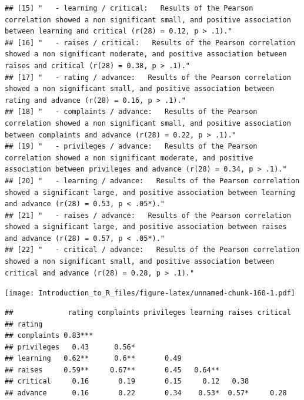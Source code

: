 \documentclass[]{book}
\newenvironment{Shaded}{\begin{snugshade}}{\end{snugshade}}
\newcommand{\CommentTok}[1]{\textcolor[rgb]{0.56,0.35,0.01}{\textit{#1}}}
\newcommand{\NormalTok}[1]{#1}
\newcommand{\OperatorTok}[1]{\textcolor[rgb]{0.81,0.36,0.00}{\textbf{#1}}}
\theoremstyle{definition}
\theoremstyle{definition}
\theoremstyle{definition}
\theoremstyle{remark}
\begin{document}
\begin{verbatim}
## [15] "   - learning / critical:   Results of the Pearson correlation showed a non significant small, and positive association between learning and critical (r(28) = 0.12, p > .1)."          
## [16] "   - raises / critical:   Results of the Pearson correlation showed a non significant moderate, and positive association between raises and critical (r(28) = 0.38, p > .1)."           
## [17] "   - rating / advance:   Results of the Pearson correlation showed a non significant small, and positive association between rating and advance (r(28) = 0.16, p > .1)."                
## [18] "   - complaints / advance:   Results of the Pearson correlation showed a non significant small, and positive association between complaints and advance (r(28) = 0.22, p > .1)."        
## [19] "   - privileges / advance:   Results of the Pearson correlation showed a non significant moderate, and positive association between privileges and advance (r(28) = 0.34, p > .1)."     
## [20] "   - learning / advance:   Results of the Pearson correlation showed a significant large, and positive association between learning and advance (r(28) = 0.53, p < .05*)."              
## [21] "   - raises / advance:   Results of the Pearson correlation showed a significant large, and positive association between raises and advance (r(28) = 0.57, p < .05*)."                  
## [22] "   - critical / advance:   Results of the Pearson correlation showed a non significant small, and positive association between critical and advance (r(28) = 0.28, p > .1)."
\end{verbatim}

\begin{Shaded}
\end{Shaded}

\texttt{[image: Introduction\_to\_R\_files/figure-latex/unnamed-chunk-160-1.pdf]}

\begin{Shaded}
\end{Shaded}

\begin{verbatim}
##             rating complaints privileges learning raises critical
## rating                                                           
## complaints 0.83***                                               
## privileges   0.43      0.56*                                     
## learning   0.62**      0.6**       0.49                          
## raises     0.59**     0.67**       0.45   0.64**                 
## critical     0.16       0.19       0.15     0.12   0.38          
## advance      0.16       0.22       0.34    0.53*  0.57*     0.28
\end{verbatim}
\end{document}
